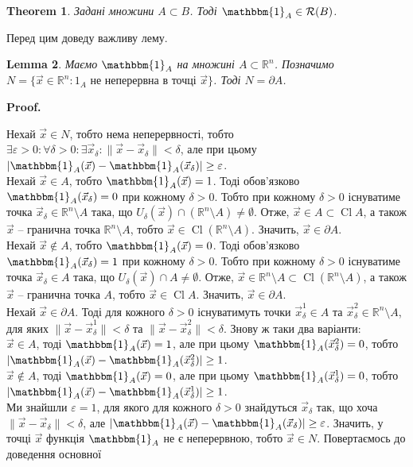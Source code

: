 \documentclass[a4paper, 10pt]{article}
\makeatletter
\def\qed{$\blacksquare$}
\theoremstyle{theoremdd}
\newtheorem{theorem}{Theorem}[subsection]
\theoremstyle{theoremdd}
\theoremstyle{theoremdd}
\theoremstyle{theoremdd}
\theoremstyle{theoremdd}
\theoremstyle{theoremdd}
\theoremstyle{theoremdd}
\theoremstyle{theoremdd}
\theoremstyle{theoremdd}
\theoremstyle{theoremdd}
\theoremstyle{theoremdd}
\theoremstyle{theoremdd}
\theoremstyle{theoremdd}
\newtheorem{lemma}[theorem]{Lemma}
\theoremstyle{theoremdd}
\theoremstyle{theoremdd}
\renewenvironment{proof}[1][Proof.\\]{\par
\pushQED{\hfill \qed}%
\normalfont \topsep6\p@\@plus6\p@\relax
\trivlist
\item\relax
{\bfseries
#1\@addpunct{.}}\hspace\labelsep\ignorespaces
}{%
\popQED\endtrivlist\@endpefalse
}
\DeclareMathOperator{\Cl}{Cl}
\makeatother
\begin{document}
\begin{theorem}
Задані множини $A \subset B$. Тоді $\mathbbm{1}_A \in \mathcal{R}(B)$.
\end{theorem}
\noindent
Перед цим доведу важливу лему.

\begin{lemma}
Маємо $\mathbbm{1}_A$ на множині $A \subset \mathbb{R}^n$. Позначимо $N = \{ \vec{x} \in \mathbb{R}^n : 1_A \text{ не неперервна в точці } \vec{x} \}$. Тоді $N = \partial A$.
\end{lemma}

\begin{proof}
Нехай $\vec{x} \in N$, тобто нема неперервності, тобто $\exists \varepsilon > 0: \forall \delta > 0: \exists \vec{x}_\delta: \|\vec{x} - \vec{x}_\delta\| < \delta$, але при цьому $|\mathbbm{1}_A(\vec{x}) - \mathbbm{1}_A(\vec{x}_\delta)| \geq \varepsilon$.\\
Нехай $\vec{x} \in A$, тобто $\mathbbm{1}_A(\vec{x}) = 1$. Тоді обов'язково $\mathbbm{1}_A(\vec{x}_\delta) = 0$ при кожному $\delta > 0$. Тобто при кожному $\delta > 0$ існуватиме точка $\vec{x}_\delta \in \mathbb{R}^n \setminus A$ така, що $U_\delta(\vec{x}) \cap (\mathbb{R}^n \setminus A) \neq \emptyset$. Отже, $\vec{x} \in A \subset \Cl A$, а також $\vec{x}$ -- гранична точка $\mathbb{R}^n \setminus A$, тобто $\vec{x} \in \Cl (\mathbb{R}^n \setminus A)$. Значить, $\vec{x} \in \partial A$.\\
Нехай $\vec{x} \notin A$, тобто $\mathbbm{1}_A(\vec{x}) = 0$. Тоді обов'язково $\mathbbm{1}_A(\vec{x}_\delta) = 1$ при кожному $\delta > 0$. Тобто при кожному $\delta > 0$ існуватиме точка $\vec{x}_\delta \in A$ така, що $U_\delta(\vec{x}) \cap A \neq \emptyset$. Отже, $\vec{x} \in \mathbb{R}^n \setminus A \subset \Cl (\mathbb{R}^n \setminus A)$, а також $\vec{x}$ -- гранична точка $A$, тобто $\vec{x} \in \Cl A$. Значить, $\vec{x} \in \partial A$.
\bigskip \\
Нехай $\vec{x} \in \partial A$. Тоді для кожного $\delta > 0$ існуватимуть точки $\vec{x}^1_\delta \in A$ та $\vec{x}^2_\delta \in \mathbb{R}^n \setminus A$, для яких $\|\vec{x} - \vec{x}^1_\delta\| < \delta$ та $\|\vec{x} - \vec{x}^2_\delta \| < \delta$. Знову ж таки два варіанти:\\
$\vec{x} \in A$, тоді $\mathbbm{1}_A(\vec{x}) = 1$, але при цьому $\mathbbm{1}_A(\vec{x}^2_\delta) = 0$, тобто $|\mathbbm{1}_A(\vec{x}) - \mathbbm{1}_A(\vec{x}^2_\delta)| \geq 1$.\\
$\vec{x} \notin A$, тоді $\mathbbm{1}_A(\vec{x}) = 0$, але при цьому $\mathbbm{1}_A(\vec{x}^1_\delta) = 0$, тобто $|\mathbbm{1}_A(\vec{x}) - \mathbbm{1}_A(\vec{x}^1_\delta)| \geq 1$.\\
Ми знайшли $\varepsilon = 1$, для якого для кожного $\delta > 0$ знайдуться $\vec{x}_\delta$ так, що хоча $\|\vec{x} - \vec{x}_\delta\| < \delta$, але $|\mathbbm{1}_A(\vec{x}) - \mathbbm{1}_A(\vec{x}_\delta)| \geq \varepsilon$. Значить, у точці $\vec{x}$ функція $\mathbbm{1}_A$ не є неперервною, тобто $\vec{x} \in N$.
\end{proof}
\noindent
Повертаємось до доведення основної
\end{document}
